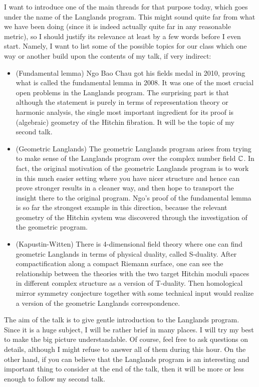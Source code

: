 I want to introduce one of the main threads for that purpose today, which goes under the name of the Langlands program. This might sound quite far from what we have been doing (since it is indeed actually quite far in any reasonable metric), so I should justify its relevance at least by a few words before I even start. Namely, I want to list some of the possible topics for our class which one way or another build upon the contents of my talk, if very indirect:
\begin{itemize}
\item (Fundamental lemma) Ngo Bao Chau got his fields medal in 2010, proving what is called the fundamental lemma in 2008. It was one of the most crucial open problems in the Langlands program. The surprising part is that although the statement is purely in terms of representation theory or harmonic analysis, the single most important ingredient for its proof is (algebraic) geometry of the Hitchin fibration. It will be the topic of my second talk.
\item (Geometric Langlands) The geometric Langlands program arises from trying to make sense of the Langlands program over the complex number field $\mathbb{C}$. In fact, the original motivation of the geometric Langlands program is to work in this much easier setting where you have nicer structure and hence can prove stronger results in a cleaner way, and then hope to transport the insight there to the original program. Ngo's proof of the fundamental lemma is so far the strongest example in this direction, because the relevant geometry of the Hitchin system was discovered through the investigation of the geometric program.
\item (Kapustin-Witten) There is 4-dimensional field theory where one can find geometric Langlands in terms of physical duality, called S-duality. After compactification along a compact Riemann surface, one can see the relationship between the theories with the two target Hitchin moduli spaces in different complex structure as a version of T-duality. Then homological mirror symmetry conjecture together with some technical input would realize a version of the geometric Langlands correspondence.
\end{itemize}

The aim of the talk is to give gentle introduction to the Langlands program. Since it is a huge subject, I will be rather brief in many places. I will try my best to make the big picture understandable. Of course, feel free to ask questions on details, although I might refuse to answer all of them during this hour. On the other hand, if you can believe that the Langlands program is an interesting and important thing to consider at the end of the talk, then it will be more or less enough to follow my second talk.

